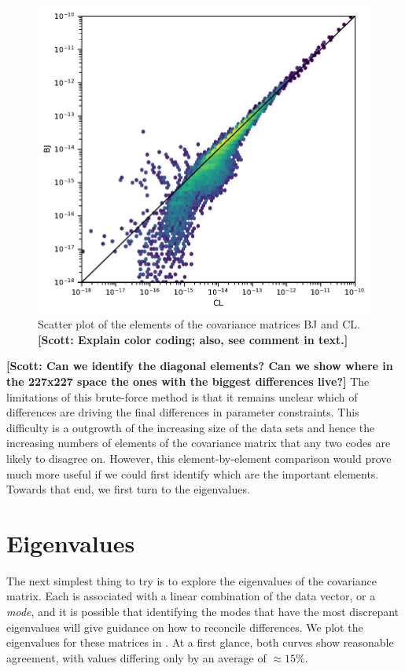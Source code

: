 \documentclass[twocolumn]{\docclass}
\newcommand\scott[1]{{\bf [Scott: #1]}}
\begin{document}
	\begin{figure}
		\includegraphics[width=0.9\columnwidth]{One-to-one-Y3_BJ-CL.pdf}
		\caption{Scatter plot of the elements of the covariance matrices BJ and CL. \scott{Explain color coding; also, see comment in text.}
			\label{fig:one-to-one}}
	\end{figure}
	
\scott{Can we identify the diagonal elements? Can we show where in the 227x227 space the ones with the biggest differences live?} The limitations of this brute-force method is that it remains unclear which of differences are driving the final differences in parameter constraints. This difficulty is a outgrowth of the increasing size of the data sets and hence the increasing numbers of elements of the covariance matrix that any two codes are likely to disagree on. However, this element-by-element comparison would prove much more useful if we could first identify which are the important elements. Towards that end, we first turn to the eigenvalues.
	
\section{Eigenvalues}
	
	The next simplest thing to try is to explore the eigenvalues of the covariance matrix. Each is associated with a linear combination of the data vector, or a \emph{mode}, and it is possible that identifying the modes that have the most discrepant eigenvalues will give guidance on how to reconcile differences.  We plot the eigenvalues for these matrices in . At a first glance, both curves show reasonable agreement, with values differing only by an average of $\approx 15\%$.
	
\end{document}
